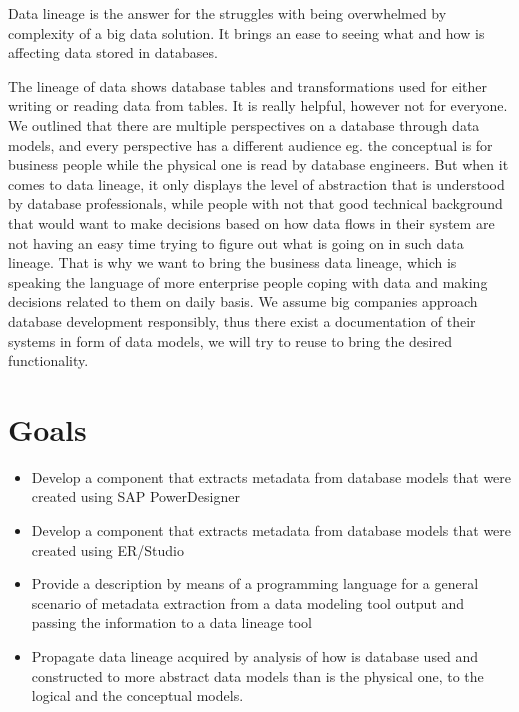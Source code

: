 Data lineage is the answer for the struggles with being overwhelmed by complexity of a big data solution. It brings an ease to seeing what and how is affecting data stored in databases.

The lineage of data shows database tables and transformations used for either writing or reading data from tables. It is really helpful, however not for everyone. 
We outlined that there are multiple perspectives on a database through data models, and every perspective has a different audience eg. the conceptual is for business people while the physical one is read by database engineers.
But when it comes to data lineage, it only displays the level of abstraction that is understood by database professionals, while people with not that good technical background that would want to make decisions based on how data flows in their system are not having an easy time trying to figure out what is going on in such data lineage.
That is why we want to bring the business data lineage, which is speaking the language of more enterprise people coping with data and making decisions related to them on daily basis. We assume  big companies approach database development responsibly, thus there exist a documentation of their systems in form of data models, we will try to reuse to bring the desired functionality.

\section{Goals}

\begin{itemize}
	\item Develop a component that extracts metadata from database models that were created using SAP PowerDesigner 
	\item Develop a component that extracts metadata from database models that were created using ER/Studio
	\item Provide a description by means of a programming language for a general scenario of metadata extraction from a data modeling tool output and passing the information to a data lineage tool
	\item Propagate data lineage acquired by analysis of how is database used and constructed to more abstract data models than is the physical one, to the logical and the conceptual models.
\end{itemize}


